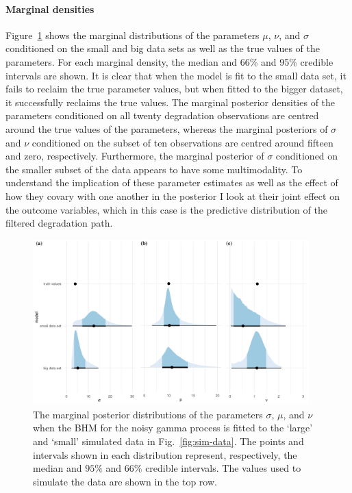 \paragraph*{Marginal densities}
Figure~\ref{fig:marginal-post} shows the marginal distributions of the parameters $\mu$, $\nu$, and $\sigma$ conditioned on the small and big data sets as well as the true values of the parameters. For each marginal density, the median and 66\% and 95\% credible intervals are shown. It is clear that when the model is fit to the small data set, it fails to reclaim the true parameter values, but when fitted to the bigger dataset, it successfully reclaims the true values. The marginal posterior densities of the parameters conditioned on all twenty degradation observations are centred around the true values of the parameters, whereas the marginal posteriors of $\sigma$ and $\nu$ conditioned on the subset of ten observations are centred around fifteen and zero, respectively. Furthermore, the marginal posterior of $\sigma$ conditioned on the smaller subset of the data appears to have some multimodality. To understand the implication of these parameter estimates as well as the effect of how they covary with one another in the posterior I look at their joint effect on the outcome variables, which in this case is the predictive distribution of the filtered degradation path.

\begin{figure}
  \centering
  \includegraphics[width=0.95\textwidth]{./figures/ch-4/marginal-posterior_a.pdf}
  \caption{The marginal posterior distributions of the parameters $\sigma$, $\mu$, and $\nu$ when the BHM for the noisy gamma process is fitted to the `large' and `small' simulated data in Fig.~\ref{fig:sim-data}. The points and intervals shown in each distribution represent, respectively, the median and $95\%$ and $66\%$ credible intervals. The values used to simulate the data are shown in the top row.}
  \label{fig:marginal-post}
\end{figure}

